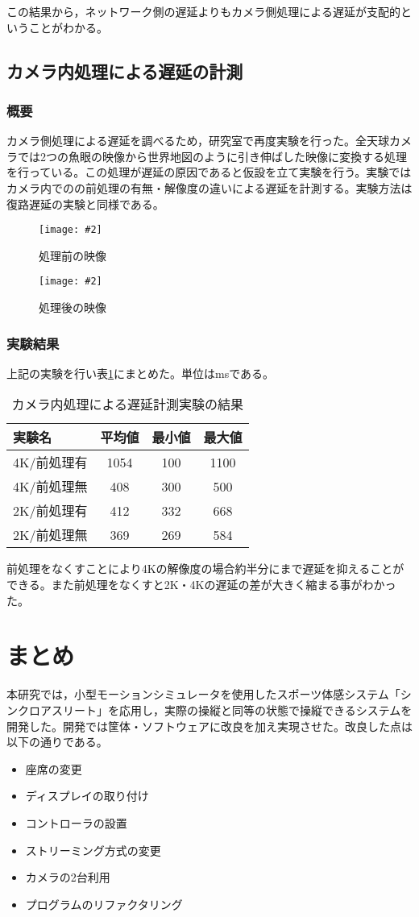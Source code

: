 \documentclass[a4paper,12pt]{jsarticle}
\newcommand{\tabref}[1]{表\ref{#1}}
\newcommand{\fig}[4][width=\textwidth]{
    \begin{figure}[!h]
    \begin{center}
    \texttt{[image: \#2]}
    \caption{#3}
    \label{#4}
    \vspace*{-1cm}
    \end{center}
    \end{figure}
}
\begin{document}
この結果から，ネットワーク側の遅延よりもカメラ側処理による遅延が支配的ということがわかる。
\clearpage

\subsection{カメラ内処理による遅延の計測}
\subsubsection{概要}
カメラ側処理による遅延を調べるため，研究室で再度実験を行った。全天球カメラでは2つの魚眼の映像から世界地図のように引き伸ばした映像に変換する処理を行っている。この処理が遅延の原因であると仮設を立て実験を行う。実験ではカメラ内でのの前処理の有無・解像度の違いによる遅延を計測する。実験方法は復路遅延の実験と同様である。
\fig[width=7cm]{image/theta_dualfisheye.jpg}{処理前の映像}{theta_dualfisheye}
\fig[width=7cm]{image/theta_equirectangular.jpg}{処理後の映像}{theta_equirectangular}
\clearpage

\subsubsection{実験結果}
上記の実験を行い\tabref{camera_table}にまとめた。単位はmsである。

\begin{table}[htb]
\begin{center}
\begin{tabular}{l|c|c|c}
実験名 & 平均値 & 最小値 & 最大値 \\ \hline
4K/前処理有 & 1054 & 100 & 1100 \\
4K/前処理無 & 408 & 300 & 500 \\
2K/前処理有 & 412 & 332 & 668 \\
2K/前処理無 & 369 & 269 & 584 \\
\end{tabular}
\caption{カメラ内処理による遅延計測実験の結果}
\label{camera_table}
\end{center}
\end{table}

前処理をなくすことにより4Kの解像度の場合約半分にまで遅延を抑えることができる。また前処理をなくすと2K・4Kの遅延の差が大きく縮まる事がわかった。
\clearpage

\section{まとめ}
本研究では，小型モーションシミュレータを使用したスポーツ体感システム「シンクロアスリート」を応用し，実際の操縦と同等の状態で操縦できるシステムを開発した。開発では筐体・ソフトウェアに改良を加え実現させた。改良した点は以下の通りである。
\begin{itemize}
  \item 座席の変更
  \item ディスプレイの取り付け
  \item コントローラの設置
  \item ストリーミング方式の変更
  \item カメラの2台利用
  \item プログラムのリファクタリング
\end{itemize}
\end{document}
